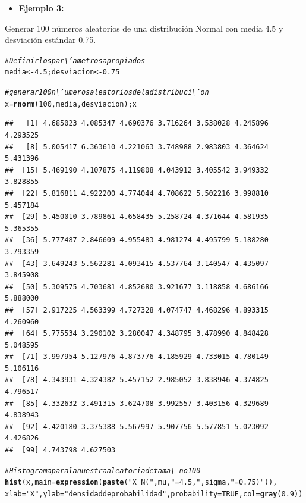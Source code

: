 \documentclass[12pt,letterpaper]{article}\usepackage[]{graphicx}\usepackage[]{color}
\makeatletter
\newcommand{\hlnum}[1]{\textcolor[rgb]{0.686,0.059,0.569}{#1}}%
\newcommand{\hlstr}[1]{\textcolor[rgb]{0.192,0.494,0.8}{#1}}%
\newcommand{\hlcom}[1]{\textcolor[rgb]{0.678,0.584,0.686}{\textit{#1}}}%
\newcommand{\hlstd}[1]{\textcolor[rgb]{0.345,0.345,0.345}{#1}}%
\newcommand{\hlkwb}[1]{\textcolor[rgb]{0.69,0.353,0.396}{#1}}%
\newcommand{\hlkwc}[1]{\textcolor[rgb]{0.333,0.667,0.333}{#1}}%
\newcommand{\hlkwd}[1]{\textcolor[rgb]{0.737,0.353,0.396}{\textbf{#1}}}%
\newenvironment{kframe}{%
 \def\at@end@of@kframe{}%
 \ifinner\ifhmode%
  \def\at@end@of@kframe{\end{minipage}}%
  \begin{minipage}{\columnwidth}%
 \fi\fi%
 \def\FrameCommand##1{\hskip\@totalleftmargin \hskip-\fboxsep
 \colorbox{shadecolor}{##1}\hskip-\fboxsep
     \hskip-\linewidth \hskip-\@totalleftmargin \hskip\columnwidth}%
 \MakeFramed {\advance\hsize-\width
   \@totalleftmargin\z@ \linewidth\hsize
   \@setminipage}}%
 {\par\unskip\endMakeFramed%
 \at@end@of@kframe}
\newenvironment{knitrout}{}{} %
\makeatother
\begin{document}
\begin{itemize}
  \item \textbf{Ejemplo 3:}
\end{itemize}
Generar 100 n\'umeros aleatorios de una distribuci\'on Normal con media 4.5 y desviaci\'on est\'andar 0.75.
\begin{knitrout}
\color{fgcolor}\begin{kframe}
\begin{alltt}
\hlcom{# Definir los par\textbackslash{}'ametros apropiados }
\hlstd{media} \hlkwb{<-} \hlnum{4.5}\hlstd{; desviacion} \hlkwb{<-} \hlnum{0.75}

\hlcom{# generar 100 n\textbackslash{}'umeros aleatorios de la distribuci\textbackslash{}'on }
\hlstd{x} \hlkwb{=} \hlkwd{rnorm}\hlstd{(}\hlnum{100}\hlstd{, media, desviacion); x}
\end{alltt}
\begin{verbatim}
##   [1] 4.685023 4.085347 4.690376 3.716264 3.538028 4.245896 4.293525
##   [8] 5.005417 6.363610 4.221063 3.748988 2.983803 4.364624 5.431396
##  [15] 5.469190 4.107875 4.119808 4.043912 3.405542 3.949332 3.828855
##  [22] 5.816811 4.922200 4.774044 4.708622 5.502216 3.998810 5.457184
##  [29] 5.450010 3.789861 4.658435 5.258724 4.371644 4.581935 5.365355
##  [36] 5.777487 2.846609 4.955483 4.981274 4.495799 5.188280 3.793359
##  [43] 3.649243 5.562281 4.093415 4.537764 3.140547 4.435097 3.845908
##  [50] 5.309575 4.703681 4.852680 3.921677 3.118858 4.686166 5.888000
##  [57] 2.917225 4.563399 4.727328 4.074747 4.468296 4.893315 4.260960
##  [64] 5.775534 3.290102 3.280047 4.348795 3.478990 4.848428 5.048595
##  [71] 3.997954 5.127976 4.873776 4.185929 4.733015 4.780149 5.106116
##  [78] 4.343931 4.324382 5.457152 2.985052 3.838946 4.374825 4.796517
##  [85] 4.332632 3.491315 3.624708 3.992557 3.403156 4.329689 4.838943
##  [92] 4.420180 3.375388 5.567997 5.907756 5.577851 5.023092 4.426826
##  [99] 4.743798 4.627503
\end{verbatim}
\begin{alltt}
\hlcom{# Histograma para la nuestra aleatoria de tama\textbackslash{}~no 100 }
\hlkwd{hist}\hlstd{(x,}\hlkwc{main}\hlstd{=}\hlkwd{expression}\hlstd{(}\hlkwd{paste}\hlstd{(}\hlstr{"X ~ N("}\hlstd{, mu,} \hlstr{" = 4.5, "}\hlstd{, sigma,} \hlstr{" = 0.75)"}\hlstd{)),}
\hlkwc{xlab}\hlstd{=}\hlstr{"X"}\hlstd{,} \hlkwc{ylab}\hlstd{=}\hlstr{"densidad de probabilidad"}\hlstd{,} \hlkwc{probability}\hlstd{=}\hlnum{TRUE}\hlstd{,} \hlkwc{col}\hlstd{=}\hlkwd{gray}\hlstd{(}\hlnum{0.9}\hlstd{))}


\end{alltt}
\end{kframe}
\end{knitrout}
\end{document}
